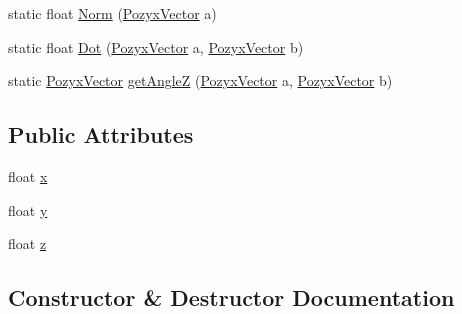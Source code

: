 \begin{DoxyCompactItemize}
\item 
static float \hyperlink{struct_pozyx_subscriber_1_1_framework_1_1_pozyx_vector_a44da2728624c5997efe7a086d1c11356}{Norm} (\hyperlink{struct_pozyx_subscriber_1_1_framework_1_1_pozyx_vector}{Pozyx\+Vector} a)
\item 
static float \hyperlink{struct_pozyx_subscriber_1_1_framework_1_1_pozyx_vector_abc07da4b47b1141e447f0a6a57fbb5fb}{Dot} (\hyperlink{struct_pozyx_subscriber_1_1_framework_1_1_pozyx_vector}{Pozyx\+Vector} a, \hyperlink{struct_pozyx_subscriber_1_1_framework_1_1_pozyx_vector}{Pozyx\+Vector} b)
\item 
static \hyperlink{struct_pozyx_subscriber_1_1_framework_1_1_pozyx_vector}{Pozyx\+Vector} \hyperlink{struct_pozyx_subscriber_1_1_framework_1_1_pozyx_vector_a57884d6f0b0e0ae9d5745ce88848597d}{get\+AngleZ} (\hyperlink{struct_pozyx_subscriber_1_1_framework_1_1_pozyx_vector}{Pozyx\+Vector} a, \hyperlink{struct_pozyx_subscriber_1_1_framework_1_1_pozyx_vector}{Pozyx\+Vector} b)
\end{DoxyCompactItemize}
\subsection*{Public Attributes}
\begin{DoxyCompactItemize}
\item 
float \hyperlink{struct_pozyx_subscriber_1_1_framework_1_1_pozyx_vector_aaf687bd5085dd3c3f7898837f01c83d7}{x}
\item 
float \hyperlink{struct_pozyx_subscriber_1_1_framework_1_1_pozyx_vector_a797da3992cbe6488a25af4dcf7acf297}{y}
\item 
float \hyperlink{struct_pozyx_subscriber_1_1_framework_1_1_pozyx_vector_a600da165d6704d619340ce23e4920b0e}{z}
\end{DoxyCompactItemize}


\subsection{Constructor \& Destructor Documentation}
\mbox{\label{struct_pozyx_subscriber_1_1_framework_1_1_pozyx_vector_a9b698d9e83339b4a71856aefdca5e1b6}} 
